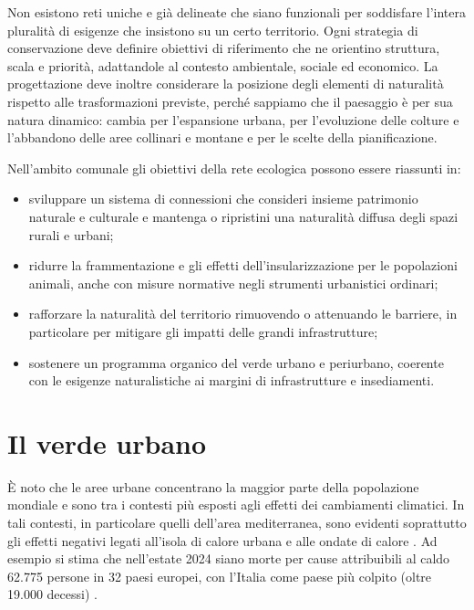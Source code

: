 \documentclass[
  a4paper,
]{book}
\providecommand{\tightlist}{%
  \setlength{\itemsep}{0pt}\setlength{\parskip}{0pt}}
\begin{document}
Non esistono reti uniche e già delineate che siano funzionali per soddisfare l'intera pluralità di esigenze che insistono su un certo territorio.
Ogni strategia di conservazione deve definire obiettivi di riferimento che ne orientino struttura, scala e priorità, adattandole al contesto ambientale, sociale ed economico.
La progettazione deve inoltre considerare la posizione degli elementi di naturalità rispetto alle trasformazioni previste, perché sappiamo che il paesaggio è per sua natura dinamico: cambia per l'espansione urbana, per l'evoluzione delle colture e l'abbandono delle aree collinari e montane e per le scelte della pianificazione.

Nell'ambito comunale gli obiettivi della rete ecologica possono essere riassunti in:

\begin{itemize}
\tightlist
\item
  sviluppare un sistema di connessioni che consideri insieme patrimonio naturale e culturale e mantenga o ripristini una naturalità diffusa degli spazi rurali e urbani;
\item
  ridurre la frammentazione e gli effetti dell'insularizzazione per le popolazioni animali, anche con misure normative negli strumenti urbanistici ordinari;
\item
  rafforzare la naturalità del territorio rimuovendo o attenuando le barriere, in particolare per mitigare gli impatti delle grandi infrastrutture;
\item
  sostenere un programma organico del verde urbano e periurbano, coerente con le esigenze naturalistiche ai margini di infrastrutture e insediamenti.
\end{itemize}

\section{Il verde urbano}\label{il-verde-urbano}

È noto che le aree urbane concentrano la maggior parte della popolazione mondiale e sono tra i contesti più esposti agli effetti dei cambiamenti climatici.
In tali contesti, in particolare quelli dell'area mediterranea, sono evidenti soprattutto gli effetti negativi legati all'isola di calore urbana e alle ondate di calore \citep{konijnendijk2023}.
Ad esempio si stima che nell'estate 2024 siano morte per cause attribuibili al caldo 62.775 persone in 32 paesi europei, con l'Italia come paese più colpito (oltre 19.000 decessi) \citep{janos2025}.
\end{document}
